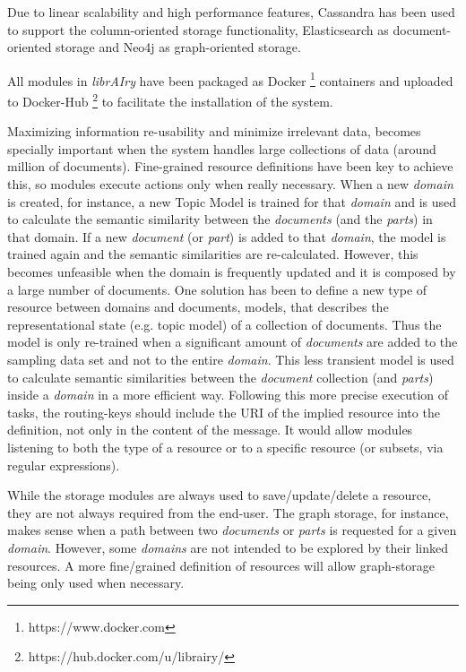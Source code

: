 Due to linear scalability and high performance features, Cassandra has been used to support the column-oriented storage functionality, Elasticsearch as document-oriented storage and Neo4j as graph-oriented storage. 

All modules in \textit{librAIry} have been packaged as Docker \footnote{https://www.docker.com} containers and uploaded to Docker-Hub \footnote{https://hub.docker.com/u/librairy/} to facilitate the installation of the system. 

Maximizing information re-usability and minimize irrelevant data, becomes specially important when the system handles large collections of data (around million of documents). Fine-grained resource definitions have been key to achieve this, so modules execute actions only when really necessary. When a new \textit{domain} is created, for instance, a new Topic Model is trained for that \textit{domain} and is used to calculate the semantic similarity between the \textit{documents} (and the \textit{parts}) in that domain. If a new \textit{document} (or \textit{part}) is added to that \textit{domain}, the model is trained again and the semantic similarities are re-calculated. However, this becomes unfeasible when the domain is frequently updated and it is composed by a large number of documents. One solution has been to define a new type of resource between domains and documents, models, that describes the representational state (e.g. topic model) of a collection of documents. Thus the model is only re-trained when a significant amount of \textit{documents} are added to the sampling data set and not to the entire \textit{domain}. This less transient model is used to calculate semantic similarities between the \textit{document} collection (and \textit{parts}) inside a \textit{domain} in a more efficient way. Following this more precise execution of tasks, the routing-keys should include the URI of the implied resource into the definition, not only in the content of the message. It would allow modules listening to both the type of a resource or to a specific resource (or subsets, via regular expressions). 

While the storage modules are always used to save/update/delete a resource, they are not always required from the end-user. The graph storage, for instance, makes sense when a path between two \textit{documents} or \textit{parts} is requested for a given \textit{domain}. However, some \textit{domains} are not intended to be explored by their linked resources. A more fine/grained definition of resources will allow graph-storage being only used when necessary. 

